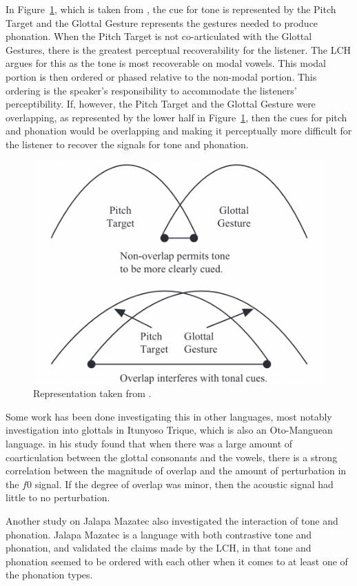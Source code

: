 \documentclass[12pt, letterpaper]{article}
\begin{document}
In Figure~\ref{fig:GlottalGestures}, which is taken from \citet{dicanioCoarticulationToneGlottal2012}, the cue for tone is represented by the Pitch Target and the Glottal Gesture represents the gestures needed to produce phonation. When the Pitch Target is not co-articulated with the Glottal Gestures, there is the greatest perceptual recoverability for the listener. The LCH argues for this as the tone is most recoverable on modal vowels. This modal portion is then ordered or phased relative to the non-modal portion. This ordering is the speaker's responsibility to accommodate the listeners' perceptibility. If, however, the Pitch Target and the Glottal Gesture were overlapping, as represented by the lower half in Figure~\ref{fig:GlottalGestures}, then the cues for pitch and phonation would be overlapping and making it perceptually more difficult for the listener to recover the signals for tone and phonation.  
\begin{figure}[!ht]
	\centering
	\includegraphics[width=.5\textwidth]{Gestures.png}
	\caption{Representation taken from \citet{dicanioCoarticulationToneGlottal2012}.}
	\label{fig:GlottalGestures}
\end{figure}

Some work has been done investigating this in other languages, most notably  investigation into glottals in Itunyoso Trique, which is also an Oto-Manguean language. \citeauthor{dicanioCoarticulationToneGlottal2012} in his study found that when there was a large amount of coarticulation between the glottal consonants and the vowels, there is a strong correlation between the magnitude of overlap and the amount of perturbation in the $f0$ signal. If the degree of overlap was minor, then the acoustic signal had little to no perturbation.

Another study on Jalapa Mazatec \citep{garellekAcousticConsequencesPhonation2011} also investigated the interaction of tone and phonation. Jalapa Mazatec is a language with both contrastive tone and phonation, and \citet{garellekAcousticConsequencesPhonation2011} validated the claims made by the LCH, in that tone and phonation seemed to be ordered with each other when it comes to at least one of the phonation types. 
\end{document}
